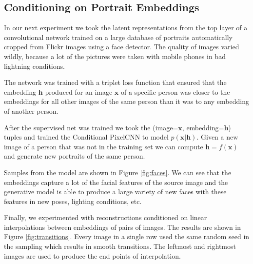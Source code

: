 \documentclass{article}
\renewcommand{\vec}{\mathbf}
\begin{document}
\subsection{Conditioning on Portrait Embeddings}
\label{portraits}

In our next experiment we took the latent representations from the top layer of a convolutional network trained on a large database of portraits automatically cropped from Flickr images using a face detector.
The quality of images varied wildly, because a lot of the pictures were taken with mobile phones in bad lightning conditions. 

The network was trained with a triplet loss function \cite{schroff2015facenet} that ensured that the embedding $\vec{h}$ produced for an image $\vec{x}$ of a specific person was closer to the embeddings for all other images of the same person than it was to any embedding of another person.

After the supervised net was trained we took the (image=$\vec{x}$, embedding=$\vec{h}$) tuples and trained the Conditional PixelCNN to model $p(\vec{x}|\vec{h})$. Given a new image of a person that was not in the training set we can compute $\vec{h}=f(\vec{x})$ and generate new portraits of the same person. 

Samples from the model are shown in Figure \ref{fig:faces}. We can see that the embeddings capture a lot of the facial features of the source image and the generative model is able to produce a large variety of new faces with these features in new poses, lighting conditions, etc.

Finally, we experimented with reconstructions conditioned on linear interpolations between embeddings of pairs of images. The results are shown in Figure \ref{fig:transitions}. Every image in a single row used the same random seed in the sampling which results in smooth transitions. The leftmost and rightmost images are used to produce the end points of interpolation.
\end{document}
